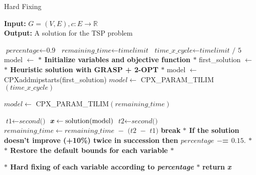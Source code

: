 \begin{algorithm}
    \caption{Hard Fixing}\label{Hard Fixing}
    
    \hspace*{\algorithmicindent} \textbf{Input:} $G = (V,E) , c : E \rightarrow \mathbb{R}$\\
    \hspace*{\algorithmicindent} \textbf{Output:} A solution for the TSP problem
    \begin{algorithmic}[1]
    \State $\textit{percentage} \gets \textit{0.9}$
    \State $\textit{remaining\_time} \gets \textit{timelimit}$
    \State $\textit{time\_x\_cycle} \gets \textit{timelimit / 5}$
    \State model $ \leftarrow $ \textbf{$\ast$ Initialize variables and objective function $\ast$ }
    \State first\_solution $ \leftarrow $ \textbf{$\ast$ Heuristic solution with GRASP + 2-OPT $\ast$ }
    \State model $ \leftarrow $  CPXaddmipstarts(first\_solution)
	\State $ model \gets $ CPX\_PARAM\_TILIM$(\textit{time\_x\_cycle}) $
	
	\Else \State $ model \gets $ CPX\_PARAM\_TILIM$(\textit{remaining\_time}) $
	\EndIf
	
	\State $\textit{t1} \gets \textit{second()}$
    	\State $\textbf{\textit{x}} \gets \text{solution}(\text{model}) $\;
	\State $\textit{t2} \gets \textit{second()}$
	\State $\textit{remaining\_time} \gets \textit{remaining\_time $-$ (t2 $-$ t1)}$
	\State \textbf{break}
	\EndIf
	\State \textbf{$\ast$ If the solution doesn't improve (+10\%) twice in succession then $ percentage $ $ -$= $ 0.15. $ $\ast$}
	\State \textbf{$\ast$ Restore the default bounds for each variable $\ast$}
    	\end{algorithmic}
   	\end{algorithm}
	
	\begin{algorithm}                     
   	 \begin{algorithmic} [1]              
	\State \textbf{$\ast$ Hard fixing of each variable according to \textit{percentage} $\ast$}
    \EndWhile
    \State \textbf{return} \textbf{\textit{x}} 
    \end{algorithmic}
    \end{algorithm}

